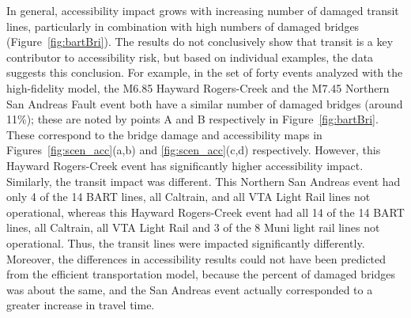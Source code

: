 In general, accessibility impact grows with increasing number of damaged transit lines, particularly in combination with high numbers of damaged bridges (Figure~\ref{fig:bartBri}). The results do not conclusively show that transit is a key contributor to accessibility risk, but based on individual examples, the data suggests this conclusion. For example, in the set of forty events analyzed with the high-fidelity model, the M6.85 Hayward Rogers-Creek and the M7.45 Northern San Andreas Fault event both have a similar number of damaged bridges (around 11\%); these are noted by points A and B respectively in Figure~\ref{fig:bartBri}. These correspond to the bridge damage and accessibility maps in Figures~\ref{fig:scen_acc}{(a,b)} and \ref{fig:scen_acc}{(c,d)} respectively.  However, this Hayward Rogers-Creek event has significantly higher accessibility impact. Similarly, the transit impact was different. This Northern San Andreas event had only 4 of the 14 BART lines, all Caltrain, and all VTA Light Rail lines not operational, whereas this Hayward Rogers-Creek event had all 14 of the 14 BART lines, all Caltrain, all VTA Light Rail and 3 of the 8 Muni light rail lines not operational. Thus, the transit lines were impacted significantly differently. Moreover, the differences in accessibility results could not have been predicted from the efficient transportation model, because the percent of damaged bridges was about the same, and the San Andreas event actually corresponded to a greater increase in travel time.



